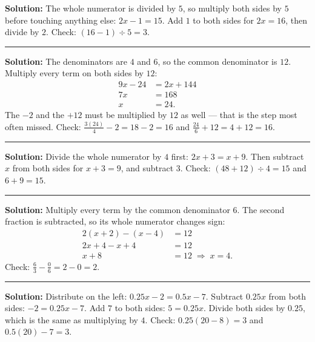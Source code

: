 \documentclass[12pt]{article}
\begin{document}
\textbf{Solution:} \quad The whole numerator is divided by $5$, so multiply both sides by $5$
before touching anything else: $2x - 1 = 15$. Add $1$ to both sides for $2x = 16$, then divide by
$2$. Check: $(16 - 1) \div 5 = 3$. 

\vspace{0.15cm}\noindent\rule{\linewidth}{0.2pt}


\textbf{Solution:} \quad The denominators are $4$ and $6$, so the common denominator is $12$.
Multiply every term on both sides by $12$:
\begin{align*}
  9x - 24 &= 2x + 144\\
  7x &= 168\\
  x &= 24.
\end{align*}
The $-2$ and the $+12$ must be multiplied by $12$ as well --- that is the step most often missed.
Check: $\frac{3(24)}{4} - 2 = 18 - 2 = 16$ and $\frac{24}{6} + 12 = 4 + 12 = 16$. 

\vspace{0.15cm}\noindent\rule{\linewidth}{0.2pt}


\textbf{Solution:} \quad Divide the whole numerator by $4$ first: $2x + 3 = x + 9$. Then subtract
$x$ from both sides for $x + 3 = 9$, and subtract $3$. Check: $(48 + 12)\div 4 = 15$ and
$6 + 9 = 15$. 

\vspace{0.15cm}\noindent\rule{\linewidth}{0.2pt}


\textbf{Solution:} \quad Multiply every term by the common denominator $6$. The second fraction is
subtracted, so its whole numerator changes sign:
\begin{align*}
  2(x + 2) - (x - 4) &= 12\\
  2x + 4 - x + 4 &= 12\\
  x + 8 &= 12 \;\Rightarrow\; x = 4.
\end{align*}
Check: $\frac{6}{3} - \frac{0}{6} = 2 - 0 = 2$. 

\vspace{0.15cm}\noindent\rule{\linewidth}{0.2pt}


\textbf{Solution:} \quad Distribute on the left: $0.25x - 2 = 0.5x - 7$. Subtract $0.25x$ from both
sides: $-2 = 0.25x - 7$. Add $7$ to both sides: $5 = 0.25x$. Divide both sides by $0.25$, which is
the same as multiplying by $4$. Check: $0.25(20 - 8) = 3$ and $0.5(20) - 7 = 3$. 
\end{document}
